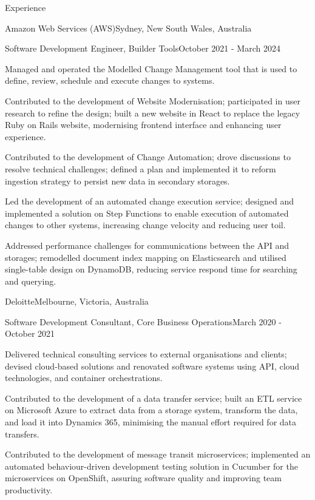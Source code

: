 \documentclass{xsha}
\begin{document}
\begin{xsection}{Experience}
\begin{xheading}{Amazon Web Services (AWS)}{Sydney, New South Wales, Australia}
\begin{xsubheading}{Software Development Engineer, Builder Tools}{October 2021 - March 2024}
\item Managed and operated the Modelled Change Management tool that is used to define, review, schedule and execute changes to systems.
\item Contributed to the development of Website Modernisation; participated in user research to refine the design; built a new website in React to replace the legacy Ruby on Rails website, modernising frontend interface and enhancing user experience.
\item Contributed to the development of Change Automation; drove discussions to resolve technical challenges; defined a plan and implemented it to reform ingestion strategy to persist new data in secondary storages.
\item Led the development of an automated change execution service; designed and implemented a solution on Step Functions to enable execution of automated changes to other systems, increasing change velocity and reducing user toil.
\item Addressed performance challenges for communications between the API and storages; remodelled document index mapping on Elasticsearch and utilised single-table design on DynamoDB, reducing service respond time for searching and querying.
\end{xsubheading}
\end{xheading}

\begin{xheading}{Deloitte}{Melbourne, Victoria, Australia}
\begin{xsubheading}{Software Development Consultant, Core Business Operations}{March 2020 - October 2021}
\item Delivered technical consulting services to external organisations and clients; devised cloud-based solutions and renovated software systems using API, cloud technologies, and container orchestrations.
\item Contributed to the development of a data transfer service; built an ETL service on Microsoft Azure to extract data from a storage system, transform the data, and load it into Dynamics 365, minimising the manual effort required for data transfers.
\item Contributed to the development of message transit microservices; implemented an automated behaviour-driven development testing solution in Cucumber for the microservices on OpenShift, assuring software quality and improving team productivity.
\end{xsubheading}
\end{xheading}


\end{xsection}
\end{document}
